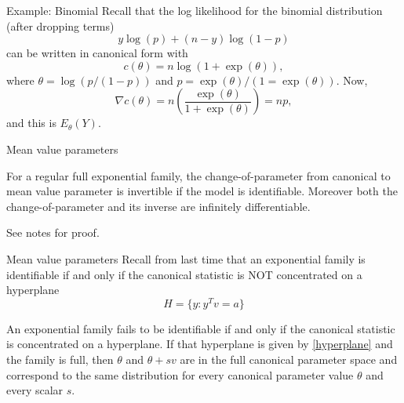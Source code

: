\documentclass[
  ignorenonframetext,
]{beamer}
\begin{document}
\begin{frame}{Example: Binomial}
\protect\hypertarget{example-binomial}{}
Recall that the log likelihood for the binomial distribution (after
dropping terms) \[
  y\log(p) + (n-y)\log(1-p)
\] can be written in canonical form with \[
  c(\theta) = n\log(1 + \exp(\theta)),
\] where \(\theta = \log(p/(1-p))\) and
\(p = \exp(\theta)/(1 = \exp(\theta))\). Now, \[
  \nabla c(\theta) = n \left(\frac{\exp(\theta)}{1 + \exp(\theta)}\right) = np,
\] and this is \(E_\theta(Y)\).
\end{frame}

\begin{frame}{Mean value parameters}
\protect\hypertarget{mean-value-parameters-1}{}
\begin{thm} \label{thm-mvp}
For a regular full exponential family, the change-of-parameter from canonical to mean value parameter is invertible if the model is identifiable. Moreover both the change-of-parameter and its inverse are infinitely differentiable.
\end{thm}

\vspace*{12pt}

See notes for proof.
\end{frame}

\begin{frame}{Mean value parameters}
\protect\hypertarget{mean-value-parameters-2}{}
Recall from last time that an exponential family is identifiable if and
only if the canonical statistic is NOT concentrated on a hyperplane
\begin{equation}\label{hyperplane}
  H = \{y : y^Tv = a\}  
\end{equation}

\vspace*{12pt}

\begin{thm}
An exponential family fails to be identifiable if and only if the canonical statistic is concentrated on a hyperplane. If that hyperplane is given by \eqref{hyperplane} and the family is full, then $\theta$ and $\theta+sv$ are in the full canonical parameter space and correspond to the same distribution for every canonical parameter value $\theta$ and every scalar $s$.     
\end{thm}
\end{frame}
\end{document}
